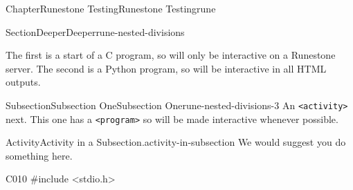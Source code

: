 \documentclass[oneside,10pt,]{book}
\newcommand{\mono}[1]{\texttt{#1}}
\numberwithin{equation}{section}
\begin{document}
\begin{chapterptx}{Chapter}{Runestone Testing}{}{Runestone Testing}{}{}{rune}
\begin{sectionptx}{Section}{Deeper}{}{Deeper}{}{}{rune-nested-divisions}
\begin{introduction}{}
\par
The first is a start of a C program, so will only be interactive on a Runestone server.  The second is a Python program, so will be interactive in all HTML outputs.%
\end{introduction}%
%
%
\typeout{************************************************}
\typeout{************************************************}
%
\begin{subsectionptx}{Subsection}{Subsection One}{}{Subsection One}{}{}{rune-nested-divisions-3}
An \mono{<activity>} next.  This one has a \mono{<program>} so will be made interactive whenever possible.%
\begin{activity}{Activity}{Activity in a Subsection.}{activity-in-subsection}%
We would suggest you do something here.%
\begin{program}{C}{0}{1}{0}
#include <stdio.h>


\end{program}
\end{activity}
\end{subsectionptx}
\end{sectionptx}
\end{chapterptx}
\end{document}
